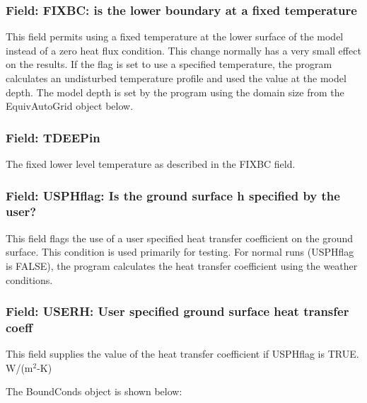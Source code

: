 \subsubsection{Field: FIXBC: is the lower boundary at a fixed temperature}\label{field-fixbc-is-the-lower-boundary-at-a-fixed-temperature}

This field permits using a fixed temperature at the lower surface of the model instead of a zero heat flux condition. This change normally has a very small effect on the results. If the flag is set to use a specified temperature, the program calculates an undisturbed temperature profile and used the value at the model depth. The model depth is set by the program using the domain size from the EquivAutoGrid object below.

\subsubsection{Field: TDEEPin}\label{field-tdeepin}

The fixed lower level temperature as described in the FIXBC field.

\subsubsection{Field: USPHflag: Is the ground surface h specified by the user?}\label{field-usphflag-is-the-ground-surface-h-specified-by-the-user}

This field flags the use of a user specified heat transfer coefficient on the ground surface. This condition is used primarily for testing. For normal runs (USPHflag is FALSE), the program calculates the heat transfer coefficient using the weather conditions.

\subsubsection{Field: USERH: User specified ground surface heat transfer coeff}\label{field-userh-user-specified-ground-surface-heat-transfer-coeff}

This field supplies the value of the heat transfer coefficient if USPHflag is TRUE. W/(m\(^{2}\)-K)

The BoundConds object is shown below:


